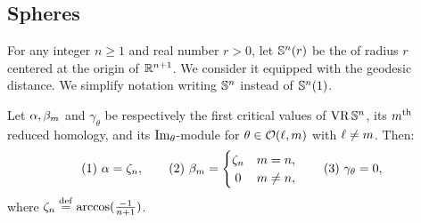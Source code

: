 
\subsection{Spheres}\label{ss:Sn}\label{subsub:critical values of Sn}

For any integer $n \geq 1$ and real number $r > 0$, let $\mathbb{S}^n(r)$ be the  of radius $r$ centered at the origin of $\mathbb{R}^{n+1}$.
We consider it equipped with the geodesic distance.
We simplify notation writing \(\mathbb{S}^n\) instead of \(\mathbb{S}^n(1)\).


\medskip\proposition
Let $\alpha, \beta_m$ and $\gamma_\theta$ be respectively the first critical values of $\operatorname{VR}\mathbb{S}^n$, its $m^{\mathrm{th}}$ reduced homology, and its $\operatorname{Im}_\theta$-module for \(\theta \in \mathcal{O}(\ell,m)\) with \(\ell \neq m\).
Then:
\[
\mathrm{(1)}\ \alpha = \zeta_n,
\qquad
\mathrm{(2)}\ \beta_m =
\begin{cases}
	\zeta_n & m = n, \\
	\hfil 0 & m \neq n,
\end{cases}
\qquad
\mathrm{(3)}\ \gamma_\theta = 0,
\]
where \(\zeta_n \stackrel{\mathrm{def}}{=} \arccos(\tfrac{-1}{n+1})\).

